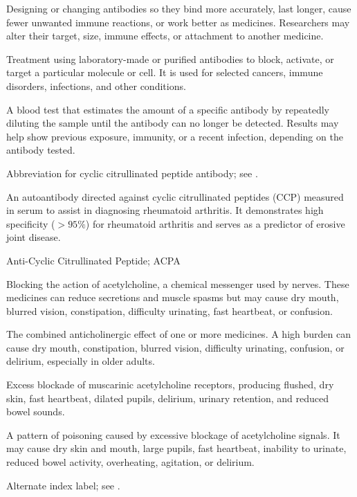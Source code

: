  Designing or changing antibodies so they bind more accurately, last longer, cause fewer unwanted immune reactions, or work better as medicines. Researchers may alter their target, size, immune effects, or attachment to another medicine.

 Treatment using laboratory-made or purified antibodies to block, activate, or target a particular molecule or cell. It is used for selected cancers, immune disorders, infections, and other conditions.

 A blood test that estimates the amount of a specific antibody by repeatedly diluting the sample until the antibody can no longer be detected. Results may help show previous exposure, immunity, or a recent infection, depending on the antibody tested.

 Abbreviation for cyclic citrullinated peptide antibody; see .

 An autoantibody directed against cyclic citrullinated peptides (CCP) measured in serum to assist in diagnosing rheumatoid arthritis. It demonstrates high specificity ($>95\%$) for rheumatoid arthritis and serves as a predictor of erosive joint disease.

\synonyms
Anti-Cyclic Citrullinated Peptide; ACPA

 Blocking the action of acetylcholine, a chemical messenger used by nerves. These medicines can reduce secretions and muscle spasms but may cause dry mouth, blurred vision, constipation, difficulty urinating, fast heartbeat, or confusion.

 The combined anticholinergic effect of one or more medicines. A high burden can cause dry mouth, constipation, blurred vision, difficulty urinating, confusion, or delirium, especially in older adults.

 Excess blockade of muscarinic acetylcholine receptors, producing flushed, dry skin, fast heartbeat, dilated pupils, delirium, urinary retention, and reduced bowel sounds.

 A pattern of poisoning caused by excessive blockage of acetylcholine signals. It may cause dry skin and mouth, large pupils, fast heartbeat, inability to urinate, reduced bowel activity, overheating, agitation, or delirium.

 Alternate index label; see .

